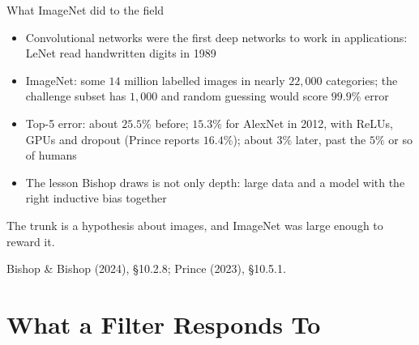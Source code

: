 \documentclass[aspectratio=169, 11pt]{beamer}
\newcommand{\srcline}[1]{%
  \par\vspace{0.25em}%
  {\scriptsize\color{mcMuted}\hfill #1\par}}
\begin{document}
\begin{frame}{What ImageNet did to the field}
  \vspace{0.1em}
  {\footnotesize
  \begin{itemize}\itemsep0.30em
    \item Convolutional networks were the first deep networks to work
          in applications: LeNet read handwritten digits in 1989
    \item ImageNet: some $14$ million labelled images in nearly
          $22{,}000$ categories; the challenge subset has $1{,}000$ and
          random guessing would score $99.9\%$ error
    \item Top-5 error: about $25.5\%$ before; $15.3\%$ for AlexNet in
          2012, with ReLUs, GPUs and dropout (Prince reports $16.4\%$);
          about $3\%$ later, past the $5\%$ or so of humans
    \item The lesson Bishop draws is not only depth: large data and a
          model with the \alert{right inductive bias} together
  \end{itemize}}
  \vspace{-0.1em}
  \begin{redhighlight}
    The trunk is a hypothesis about images, and ImageNet was large
    enough to reward it.
  \end{redhighlight}
  \vspace{-0.3em}
  \srcline{Bishop \& Bishop (2024), \S10.2.8; Prince (2023), \S10.5.1.}
\end{frame}

\section{What a Filter Responds To}
\end{document}
